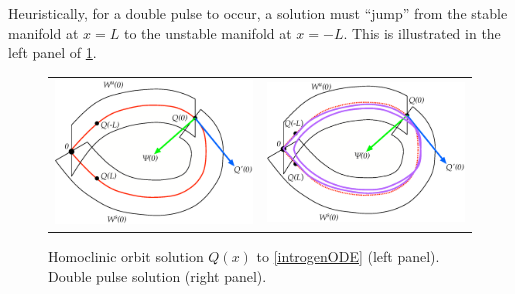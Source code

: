 \documentclass[thesis.tex]{subfiles}
\begin{document}
Heuristically, for a double pulse to occur, a solution must ``jump'' from the stable manifold at $x = L$ to the unstable manifold at $x = -L$. This is illustrated in the left panel of \cref{fig:wswu}.
\begin{figure}
\begin{center}
\begin{tabular}{cc}
\includegraphics[width=8cm]{images/intro/WsWu} &
\includegraphics[width=8cm]{images/intro/WsWuDouble}
\end{tabular}
\caption[Homoclinic orbit and double pulse]{Homoclinic orbit solution $Q(x)$ to \cref{introgenODE} (left panel). Double pulse solution (right panel). }
\label{fig:wswu}
\end{center}
\end{figure}
\end{document}
